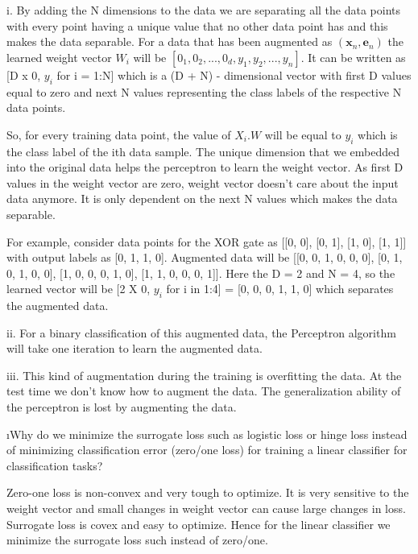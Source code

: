 \documentclass[fleqn]{article}
\begin{document}
\begin{solution}
i. By adding the N dimensions to the data we are separating all the data points with every point having a unique value that no other data point has and this makes the data separable.
For a data that has been augmented as $(\mathbf{x}_n, \mathbf{e}_n)$ the learned weight vector $W_i$ will be $[0_1, 0_2, ... ,0_d, y_1, y_2, ... , y_n]$. It can be written as [D x 0, $y_i$ for i = 1:N] which is a (D + N) - dimensional vector with first D values equal to zero and next N values representing the class labels of the respective N data points.  \newline

So, for every training data point, the value of $X_i.W$ will be equal to $y_i$ which is the class label of the ith data sample. The unique dimension that we embedded into the original data helps the perceptron to learn the weight vector.
As first D values in the weight vector are zero, weight vector doesn't care about the input data anymore. It is only dependent on the next N values which makes the data separable. \newline

For example, consider data points for the XOR gate as [[0, 0], [0, 1], [1, 0], [1, 1]] with output labels as [0, 1, 1, 0]. Augmented data will be [[0, 0, 1, 0, 0, 0], [0, 1, 0, 1, 0, 0], [1, 0, 0, 0, 1, 0], [1, 1, 0, 0, 0, 1]].
Here the D = 2 and N = 4, so the learned vector will be [2 X 0, $y_i$ for i in 1:4] = [0, 0, 0, 1, 1, 0] which separates the augmented data.\newline

ii. For a binary classification of this augmented data, the Perceptron algorithm will take one iteration to learn the augmented data.  \newline

iii.  This kind of augmentation during the training is overfitting the data. At the test time we don't know how to augment the data. The generalization ability of the perceptron is lost by augmenting the data. 



\end{solution}
\vspace{1.5in}


\i Why do we minimize the surrogate loss such as logistic loss or hinge loss instead of minimizing classification error (zero/one loss) for training a linear classifier for classification tasks?
\begin{solution}
Zero-one loss is non-convex and very tough to optimize. It is very sensitive to the weight vector and small changes in weight vector can cause large changes in loss.
Surrogate loss is covex and easy to optimize. Hence for the linear classifier we minimize the surrogate loss such instead of zero/one.

\end{solution}
\end{document}
